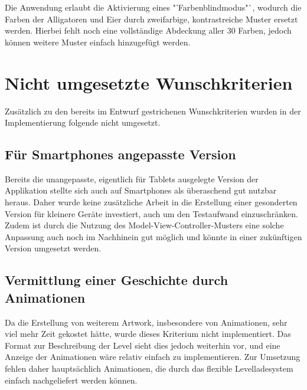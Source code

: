 Die Anwendung erlaubt die Aktivierung eines "'Farbenblindmodus"`, wodurch die Farben der Alligatoren und Eier durch zweifarbige, kontrastreiche Muster ersetzt werden.
Hierbei fehlt noch eine vollständige Abdeckung aller 30 Farben, jedoch können weitere Muster einfach hinzugefügt werden.

\section{Nicht umgesetzte Wunschkriterien}

Zusätzlich zu den bereits im Entwurf gestrichenen Wunschkriterien wurden in der Implementierung folgende nicht umgesetzt.

\subsection{Für Smartphones angepasste Version}

Bereits die unangepasste, eigentlich für Tablets ausgelegte Version der Applikation stellte sich auch auf Smartphones als überaschend gut nutzbar heraus.
Daher wurde keine zusätzliche Arbeit in die Erstellung einer gesonderten Version für kleinere Geräte investiert, auch um den Testaufwand einzuschränken.
Zudem ist durch die Nutzung des Model-View-Controller-Musters eine solche Anpassung auch noch im Nachhinein gut möglich und könnte in einer zukünftigen Version umgesetzt werden.

\subsection{Vermittlung einer Geschichte durch Animationen}

Da die Erstellung von weiterem Artwork, insbesondere von Animationen, sehr viel mehr Zeit gekostet hätte, wurde dieses Kriterium nicht implementiert.
Das Format zur Beschreibung der Level sieht dies jedoch weiterhin vor, und eine Anzeige der Animationen wäre relativ einfach zu implementieren.
Zur Umsetzung fehlen daher hauptsächlich Animationen, die durch das flexible Levelladesystem einfach nachgeliefert werden können.
